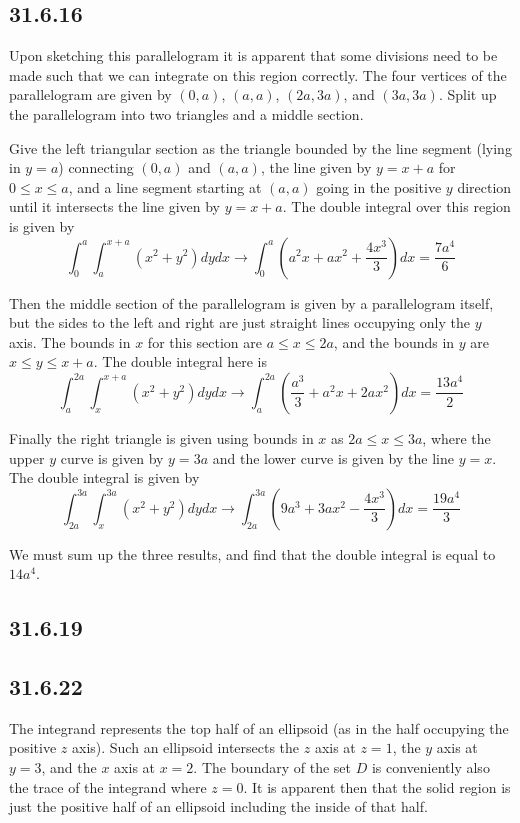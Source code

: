 \documentclass{article}
\begin{document}
\subsection{31.6.16}

Upon sketching this parallelogram it is apparent that some divisions need to be made such that we can integrate on this region correctly. The four vertices of the parallelogram are given by $(0,a)$, $(a,a)$, $(2a,3a)$, and $(3a,3a)$. Split up the parallelogram into two triangles and a middle section.

Give the left triangular section as the triangle bounded by the line segment (lying in $y = a$) connecting $(0,a)$ and $(a,a)$, the line given by $y = x+a$ for $0\leq x \leq a$, and a line segment starting at $(a,a)$ going in the positive $y$ direction until it intersects the line given by $y = x+a$. The double integral over this region is given by $$\int_0^a\int_a^{x+a}(x^2+y^2)dydx \to \int_0^a \left(a^2 x + a x^2 + \frac{4 x^3}{3}\right)dx = \frac{7a^4}{6}$$

Then the middle section of the parallelogram is given by a parallelogram itself, but the sides to the left and right are just straight lines occupying only the $y$ axis. The bounds in $x$ for this section are $a \leq x \leq 2a$, and the bounds in $y$ are $x \leq y \leq x+a$. The double integral here is $$\int_a^{2a}\int_{x}^{x+a}(x^2+y^2)dydx \to \int_a^{2a} \left(\frac{a^3}{3} + a^2 x + 2 a x^2\right)dx = \frac{13 a^4}{2}$$

Finally the right triangle is given using bounds in $x$ as $2a\leq x \leq 3a$, where the upper $y$ curve is given by $y=3a$ and the lower curve is given by the line $y=x$. The double integral is given by $$\int_{2a}^{3a}\int_x^{3a} (x^2+y^2) dydx \to \int_{2a}^{3a} \left(9 a^3 + 3 a x^2 - \frac{4 x^3}{3}\right)dx = \frac{19a^4}{3}$$

We must sum up the three results, and find that the double integral is equal to $14a^4$.

\subsection{31.6.19}

\subsection{31.6.22}

The integrand represents the top half of an ellipsoid (as in the half occupying the positive $z$ axis). Such an ellipsoid intersects the $z$ axis at $z=1$, the $y$ axis at $y = 3$, and the $x$ axis at $x=2$. The boundary of the set $D$ is conveniently also the trace of the integrand where $z=0$. It is apparent then that the solid region is just the positive half of an ellipsoid including the inside of that half.
\end{document}
